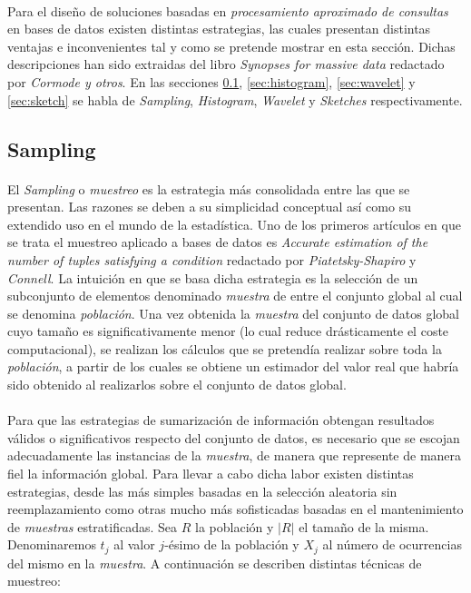 \documentclass{subfiles}
\begin{document}
      \paragraph{}
      Para el diseño de soluciones basadas en \emph{procesamiento aproximado de consultas} en bases de datos existen distintas estrategias, las cuales presentan distintas ventajas e inconvenientes tal y como se pretende mostrar en esta sección. Dichas descripciones han sido extraidas del libro \emph{Synopses for massive data} \cite{cormode2012synopses} redactado por \emph{Cormode y otros}. En las secciones \ref{sec:sampling}, \ref{sec:histogram}, \ref{sec:wavelet} y \ref{sec:sketch} se habla de \emph{Sampling}, \emph{Histogram}, \emph{Wavelet} y \emph{Sketches} respectivamente.

      \subsection{Sampling}
      \label{sec:sampling}

        \paragraph{}
        El \emph{Sampling} o \emph{muestreo} es la estrategia más consolidada entre las que se presentan. Las razones se deben a su simplicidad conceptual así como su extendido uso en el mundo de la estadística. Uno de los primeros artículos en que se trata el muestreo aplicado a bases de datos es \emph{Accurate estimation of the number of tuples satisfying a condition} \cite{piatetsky1984accurate} redactado por \emph{Piatetsky-Shapiro} y \emph{Connell}. La intuición en que se basa dicha estrategia es la selección de un subconjunto de elementos denominado \emph{muestra} de entre el conjunto global al cual se denomina \emph{población}. Una vez obtenida la \emph{muestra} del conjunto de datos global cuyo tamaño es significativamente menor (lo cual reduce drásticamente el coste computacional), se realizan los cálculos que se pretendía realizar sobre toda la \emph{población}, a partir de los cuales se obtiene un estimador del valor real que habría sido obtenido al realizarlos sobre el conjunto de datos global.

        \paragraph{}
        Para que las estrategias de sumarización de información obtengan resultados válidos o significativos respecto del conjunto de datos, es necesario que se escojan adecuadamente las instancias de la \emph{muestra}, de manera que represente de manera fiel la información global. Para llevar a cabo dicha labor existen distintas estrategias, desde las más simples basadas en la selección aleatoria sin reemplazamiento como otras mucho más sofisticadas basadas en el mantenimiento de \emph{muestras} estratificadas. Sea $R$ la población y $|R|$ el tamaño de la misma. Denominaremos $t_j$ al valor $j$-ésimo de la población y $X_j$ al número de ocurrencias del mismo en la \emph{muestra}. A continuación se describen distintas técnicas de muestreo:
\end{document}
